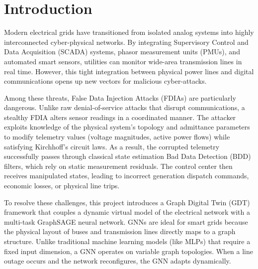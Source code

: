 \documentclass[12pt,a4paper]{report}
\begin{document}
\newpage
{}
\tableofcontents
\newpage
{}

\chapter{Introduction}
Modern electrical grids have transitioned from isolated analog systems into highly interconnected cyber-physical networks. By integrating Supervisory Control and Data Acquisition (SCADA) systems, phasor measurement units (PMUs), and automated smart sensors, utilities can monitor wide-area transmission lines in real time. However, this tight integration between physical power lines and digital communications opens up new vectors for malicious cyber-attacks.

Among these threats, False Data Injection Attacks (FDIAs) are particularly dangerous. Unlike raw denial-of-service attacks that disrupt communications, a stealthy FDIA alters sensor readings in a coordinated manner. The attacker exploits knowledge of the physical system's topology and admittance parameters to modify telemetry values (voltage magnitudes, active power flows) while satisfying Kirchhoff's circuit laws. As a result, the corrupted telemetry successfully passes through classical state estimation Bad Data Detection (BDD) filters, which rely on static measurement residuals. The control center then receives manipulated states, leading to incorrect generation dispatch commands, economic losses, or physical line trips.

To resolve these challenges, this project introduces a Graph Digital Twin (GDT) framework that couples a dynamic virtual model of the electrical network with a multi-task GraphSAGE neural network. GNNs are ideal for smart grids because the physical layout of buses and transmission lines directly maps to a graph structure. Unlike traditional machine learning models (like MLPs) that require a fixed input dimension, a GNN operates on variable graph topologies. When a line outage occurs and the network reconfigures, the GNN adapts dynamically. 
\end{document}
